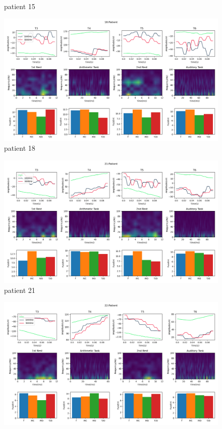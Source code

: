 \documentclass[10pt]{article}
\begin{document}
\begin{landscape}
\begin{figure}
  \caption{patient 15}
  \label{fig:patient_15}
\end{figure}
\clearpage
\begin{figure}
  \includegraphics[width=7.2in]{figures/18.png}
  \caption{patient 18}
  \label{fig:patient_18}
\end{figure}
\clearpage
\begin{figure}
  \includegraphics[width=7.2in]{figures/21.png}
  \caption{patient 21}
  \label{fig:patient_21}
\end{figure}
\clearpage
\begin{figure}
  \includegraphics[width=7.2in]{figures/22.png}

\end{figure}
\end{landscape}
\end{document}

